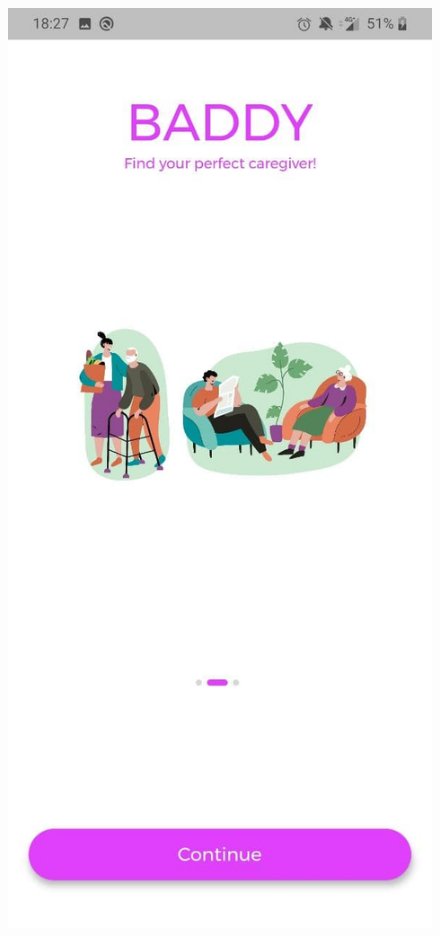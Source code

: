 \documentclass[../../dd.tex]{subfiles}
\begin{document}
\begin{figure}[H]
        \includegraphics[height=.4\textheight]{../../assets/screens/splash2.jpg}

\end{figure}
\end{document}
